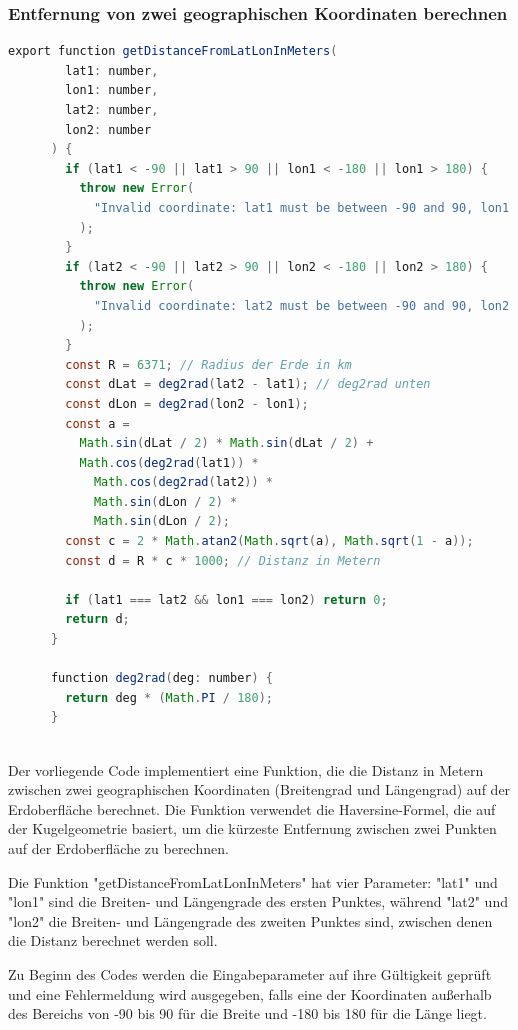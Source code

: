 \subsubsection{Entfernung von zwei geographischen Koordinaten berechnen}
\begin{lstlisting}[language=Java,caption=getDistanceFromLatLonInMeters Funktion]
    export function getDistanceFromLatLonInMeters(
        lat1: number,
        lon1: number,
        lat2: number,
        lon2: number
      ) {
        if (lat1 < -90 || lat1 > 90 || lon1 < -180 || lon1 > 180) {
          throw new Error(
            "Invalid coordinate: lat1 must be between -90 and 90, lon1 must be between -180 and 180"
          );
        }
        if (lat2 < -90 || lat2 > 90 || lon2 < -180 || lon2 > 180) {
          throw new Error(
            "Invalid coordinate: lat2 must be between -90 and 90, lon2 must be between -180 and 180"
          );
        }
        const R = 6371; // Radius der Erde in km
        const dLat = deg2rad(lat2 - lat1); // deg2rad unten
        const dLon = deg2rad(lon2 - lon1);
        const a =
          Math.sin(dLat / 2) * Math.sin(dLat / 2) +
          Math.cos(deg2rad(lat1)) *
            Math.cos(deg2rad(lat2)) *
            Math.sin(dLon / 2) *
            Math.sin(dLon / 2);
        const c = 2 * Math.atan2(Math.sqrt(a), Math.sqrt(1 - a));
        const d = R * c * 1000; // Distanz in Metern
      
        if (lat1 === lat2 && lon1 === lon2) return 0;
        return d;
      }
      
      function deg2rad(deg: number) {
        return deg * (Math.PI / 180);
      }
      
\end{lstlisting}
Der vorliegende Code implementiert eine Funktion, die die Distanz in Metern zwischen zwei geographischen Koordinaten (Breitengrad und Längengrad) auf der Erdoberfläche berechnet. Die Funktion verwendet die Haversine-Formel, die auf der Kugelgeometrie basiert, um die kürzeste Entfernung zwischen zwei Punkten auf der Erdoberfläche zu berechnen.

Die Funktion "getDistanceFromLatLonInMeters" hat vier Parameter: "lat1" und "lon1" sind die Breiten- und Längengrade des ersten Punktes, während "lat2" und "lon2" die Breiten- und Längengrade des zweiten Punktes sind, zwischen denen die Distanz berechnet werden soll.

Zu Beginn des Codes werden die Eingabeparameter auf ihre Gültigkeit geprüft und eine Fehlermeldung wird ausgegeben, falls eine der Koordinaten außerhalb des Bereichs von -90 bis 90 für die Breite und -180 bis 180 für die Länge liegt.

